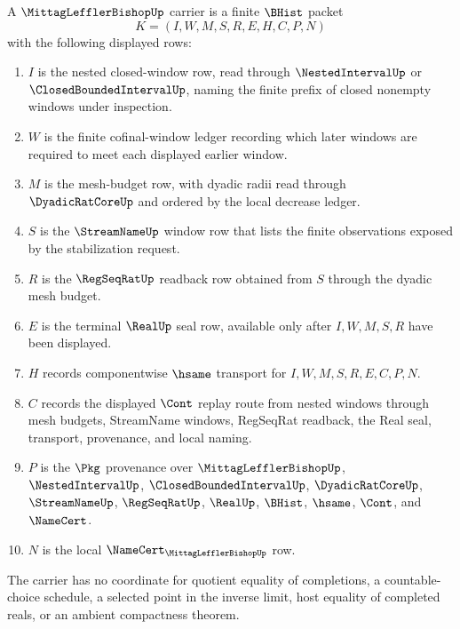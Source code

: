 \begin{definition}
\label{def:mittag-leffler-bishop-carrier}
A $\MittagLefflerBishopUp$ carrier is a finite $\BHist$ packet
$$
K=(I,W,M,S,R,E,H,C,P,N)
$$
with the following displayed rows:
\begin{enumerate}
\item $I$ is the nested closed-window row, read through $\NestedIntervalUp$ or $\ClosedBoundedIntervalUp$, naming the finite prefix of closed nonempty windows under inspection.
\item $W$ is the finite cofinal-window ledger recording which later windows are required to meet each displayed earlier window.
\item $M$ is the mesh-budget row, with dyadic radii read through $\DyadicRatCoreUp$ and ordered by the local decrease ledger.
\item $S$ is the $\StreamNameUp$ window row that lists the finite observations exposed by the stabilization request.
\item $R$ is the $\RegSeqRatUp$ readback row obtained from $S$ through the dyadic mesh budget.
\item $E$ is the terminal $\RealUp$ seal row, available only after $I,W,M,S,R$ have been displayed.
\item $H$ records componentwise $\hsame$ transport for $I,W,M,S,R,E,C,P,N$.
\item $C$ records the displayed $\Cont$ replay route from nested windows through mesh budgets, StreamName windows, RegSeqRat readback, the Real seal, transport, provenance, and local naming.
\item $P$ is the $\Pkg$ provenance over $\MittagLefflerBishopUp$, $\NestedIntervalUp$, $\ClosedBoundedIntervalUp$, $\DyadicRatCoreUp$, $\StreamNameUp$, $\RegSeqRatUp$, $\RealUp$, $\BHist$, $\hsame$, $\Cont$, and $\NameCert$.
\item $N$ is the local $\NameCert_{\MittagLefflerBishopUp}$ row.
\end{enumerate}
The carrier has no coordinate for quotient equality of completions, a countable-choice schedule, a selected point in the inverse limit, host equality of completed reals, or an ambient compactness theorem.
\end{definition}

